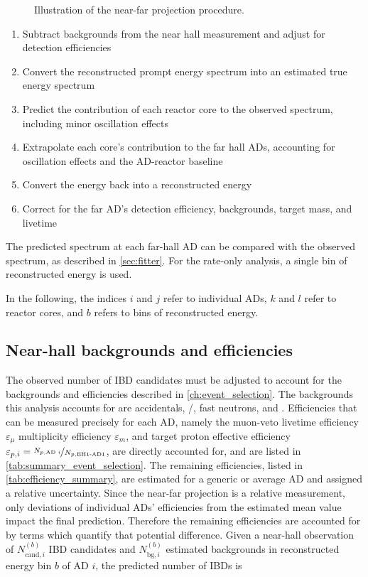 \begin{figure}
    \caption{Illustration of the near-far projection procedure.}
    \label{fig:near_far_cartoon}
\end{figure}

\begin{enumerate}
    \item Subtract backgrounds from the near hall measurement
        and adjust for detection efficiencies
    \item Convert the reconstructed prompt energy spectrum
        into an estimated true \nuebar{} energy spectrum
    \item Predict the contribution of each reactor core
        to the observed \nuebar{} spectrum,
        including minor oscillation effects
    \item Extrapolate each core's contribution to the far hall ADs,
        accounting for oscillation effects and the AD-reactor baseline
    \item Convert the \nuebar{} energy back into a reconstructed energy
    \item Correct for the far AD's detection efficiency, backgrounds,
        target mass, and livetime
\end{enumerate}
The predicted spectrum at each far-hall AD can be compared
with the observed spectrum, as described in \cref{sec:fitter}.
For the rate-only analysis, a single bin of reconstructed energy is used.

In the following, the indices $i$ and $j$ refer to individual ADs,
$k$ and $l$ refer to reactor cores,
and $b$ refers to bins of reconstructed energy.

\subsection{Near-hall backgrounds and efficiencies}
\label{subsec:near_bg_eff}

The observed number of IBD candidates must be adjusted
to account for the backgrounds and efficiencies described in \cref{ch:event_selection}.
The backgrounds this analysis accounts for are
accidentals, \li{}/\he{}, fast neutrons, and \amc{}.
Efficiencies that can be measured precisely for each AD,
namely
the muon-veto livetime efficiency $\varepsilon_\mu$
multiplicity efficiency $\varepsilon_m$,
and target proton effective efficiency
$\varepsilon_{p,i}=\nicefrac{N_{p,\text{AD }i}}{N_{p,\text{EH1-AD1}}}$,
are directly accounted for,
and are listed in \cref{tab:summary_event_selection}.
The remaining efficiencies, listed in \cref{tab:efficiency_summary},
are estimated for a generic or average AD and assigned a relative uncertainty.
Since the near-far projection is a relative measurement,
only deviations of individual ADs' efficiencies from the estimated mean value
impact the final prediction.
Therefore the remaining efficiencies are accounted for
by terms which quantify that potential difference.
Given a near-hall observation of $N_{\text{cand},i}^{(b)}$ IBD candidates
and $N_{\text{bg},i}^{(b)}$ estimated backgrounds in reconstructed energy bin $b$
of AD $i$,
the predicted number of IBDs is

